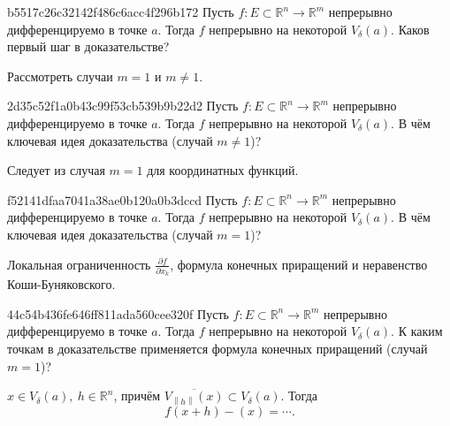 \begin{note}{b5517c26c32142f486c6acc4f296b172}
    Пусть \({ f : E \subset \mathbb R^{n} \to \mathbb R^{m} }\) непрерывно дифференцируемо в точке \({ a }\).
    Тогда \({ f }\) непрерывно на некоторой \({ V_{\delta}(a) }\).
    Каков первый шаг в доказательстве?

    \begin{cloze}{1}
        Рассмотреть случаи \({ m = 1 }\) и \({ m \neq 1 }\).
    \end{cloze}
\end{note}

\begin{note}{2d35c52f1a0b43c99f53cb539b9b22d2}
    Пусть \({ f : E \subset \mathbb R^{n} \to \mathbb R^{m} }\) непрерывно дифференцируемо в точке \({ a }\).
    Тогда \({ f }\) непрерывно на некоторой \({ V_{\delta}(a) }\).
    В чём ключевая идея доказательства (случай \({ m \neq 1 }\))?

    \begin{cloze}{1}
        Следует из случая \({ m = 1 }\) для координатных функций.
    \end{cloze}
\end{note}

\begin{note}{f52141dfaa7041a38ae0b120a0b3dccd}
    Пусть \({ f : E \subset \mathbb R^{n} \to \mathbb R^{m} }\) непрерывно дифференцируемо в точке \({ a }\).
    Тогда \({ f }\) непрерывно на некоторой \({ V_{\delta}(a) }\).
    В чём ключевая идея доказательства (случай \({ m = 1 }\))?

    \begin{cloze}{1}
        Локальная ограниченность \({ \frac{\partial f}{\partial x_k} }\), формула конечных приращений и неравенство Коши-Буняковского.
    \end{cloze}
\end{note}

\begin{note}{44c54b436fe646ff811ada560cee320f}
    Пусть \({ f : E \subset \mathbb R^{n} \to \mathbb R^{m} }\) непрерывно дифференцируемо в точке \({ a }\).
    Тогда \({ f }\) непрерывно на некоторой \({ V_{\delta}(a) }\).
    К каким точкам в доказательстве применяется формула конечных приращений (случай \({ m = 1 }\))?

    \begin{cloze}{1}
        \({ x \in V_{\delta}(a),\: h \in \mathbb R^{n} }\), причём \({ \overline{V_{\left\lVert h \right\rVert}(x)} \subset V_{\delta}(a) }\).
        Тогда
        \[
            f(x + h) - (x) = \cdots.
        \]
    \end{cloze}
\end{note}

